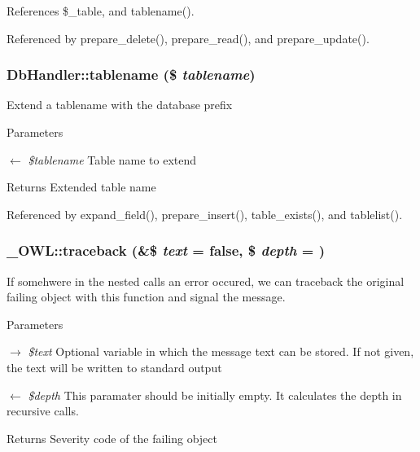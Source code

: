 References \$\_\-table, and tablename().



Referenced by prepare\_\-delete(), prepare\_\-read(), and prepare\_\-update().

\subsubsection[{tablename}]{\setlength{\rightskip}{0pt plus 5cm}DbHandler::tablename (\$ {\em tablename})}\label{classDbHandler_abaca15a312800e5522b3efd9dff036f5}
Extend a tablename with the database prefix


\begin{DoxyParams}{Parameters}
\item[\mbox{$\leftarrow$} {\em \$tablename}]Table name to extend \end{DoxyParams}
\begin{DoxyReturn}{Returns}
Extended table name 
\end{DoxyReturn}


Referenced by expand\_\-field(), prepare\_\-insert(), table\_\-exists(), and tablelist().

\subsubsection[{traceback}]{\setlength{\rightskip}{0pt plus 5cm}\_\-OWL::traceback (\&\$ {\em text} = {\ttfamily false}, \/  \$ {\em depth} = {})}\label{class__OWL_aa29547995d6741b7d2b90c1d4ea99a13}
If somehwere in the nested calls an error occured, we can traceback the original failing object with this function and signal the message.


\begin{DoxyParams}{Parameters}
\item[\mbox{$\rightarrow$} {\em \$text}]Optional variable in which the message text can be stored. If not given, the text will be written to standard output \item[\mbox{$\leftarrow$} {\em \$depth}]This paramater should be initially empty. It calculates the depth in recursive calls. \end{DoxyParams}
\begin{DoxyReturn}{Returns}
Severity code of the failing object 
\end{DoxyReturn}


